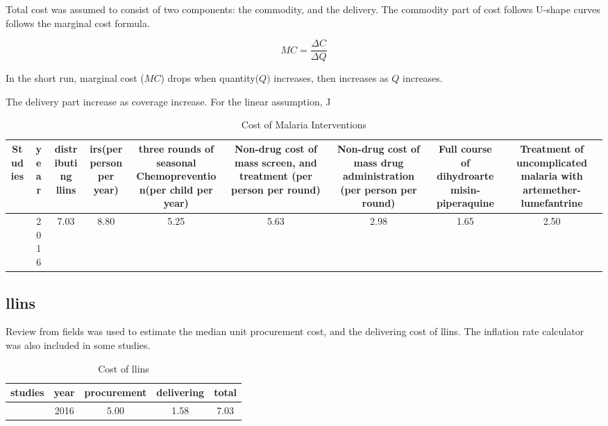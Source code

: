 \documentclass[a4paper, 12pt, twoside]{article}
\begin{document}
Total cost was assumed to consist of two components: the commodity, and the delivery. The commodity part of cost follows U-shape curves follows the marginal cost formula.

$$ MC = \frac{\Delta C}{\Delta Q} $$

In the short run, marginal cost ($MC$) drops when quantity($Q$) increases, then increases as $Q$ increases.

The delivery part increase as coverage increase. For the linear assumption, J

\begin{table}[htpb]
	\centering
	\caption{Cost of Malaria Interventions}
	\label{tab:cost_of_malaria_interventions}
	{\small
		\begin{tabular}{cSSSSSSSS}
			\toprule
			Studies           & {year} & {distributing \gls{llins}} & {\gls{irs}(per person per year)} & {three rounds of seasonal Chemoprevention(per child per year) } & {Non-drug cost of mass screen, and treatment (per person per round)} & {Non-drug cost of mass drug administration (per person per round) } & {Full course of dihydroartemisin-piperaquine} & {Treatment of uncomplicated malaria with artemether-lumefantrine} \\
			\midrule
			\cite{Walker2016} & 2016   & 7.03                       & 8.80                             & 5.25                                                            & 5.63                                                                & 2.98                                                                & 1.65                                          & 2.50                                                              \\
			\bottomrule
		\end{tabular}
	}
\end{table}

\subsection{\texorpdfstring{\gls{llins}}{LLINs}}
Review from fields was used to estimate the median unit procurement cost, and the delivering cost of \gls{llins}.
The inflation rate calculator was also included in some studies\cite{Walker2016}.

\begin{table}[htpb]
	\centering
	\caption{Cost of \gls{llins}}
	\label{tab:cost_of_llins}
	\begin{tabular}{cSSSS}
		\toprule
		studies           & {year} & {procurement} & {delivering} & {total} \\
		\midrule
		\cite{Walker2016} & 2016   & 5.00          & 1.58         & 7.03    \\
		\bottomrule
	\end{tabular}
\end{table}
\end{document}
